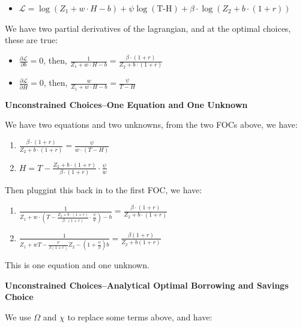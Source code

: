 \documentclass[
]{book}
\providecommand{\tightlist}{%
  \setlength{\itemsep}{0pt}\setlength{\parskip}{0pt}}
\begin{document}
\begin{itemize}
\tightlist
\item
  \(\displaystyle \mathcal{L}=\log (Z_1 +w\cdot H-b)+\psi \log (\textrm{T}\textrm{-}\textrm{H})+\beta \cdot \log (Z_2 +b\cdot (1+r))\)
\end{itemize}

We have two partial derivatives of the lagrangian, and at the optimal
choices, these are true:

\begin{itemize}
\item
  \(\frac{\partial \mathcal{L}}{\partial b}=0\), then,
  \(\frac{1}{Z_1 +w\cdot H-b}=\frac{\beta \cdot (1+r)}{Z_2 +b\cdot (1+r)}\)
\item
  \(\frac{\partial \mathcal{L}}{\partial H}=0\), then,
  \(\frac{w}{Z_1 +w\cdot H-b}=\frac{\psi }{T-H}\)
\end{itemize}

\textbf{Unconstrained Choices--One Equation and One Unknown}

We have two equations and two unknowns, from the two FOCs above, we
have:

\begin{enumerate}
\def\labelenumi{\arabic{enumi}.}
\item
  \(\displaystyle \frac{\beta \cdot (1+r)}{Z_2 +b\cdot (1+r)}=\frac{\psi }{w\cdot \left(T-H\right)}\)
\item
  \(\displaystyle H=T-\frac{Z_2 +b\cdot (1+r)}{\beta \cdot (1+r)}\cdot \frac{\psi }{w}\)
\end{enumerate}

Then pluggint this back in to the first FOC, we have:

\begin{enumerate}
\def\labelenumi{\arabic{enumi}.}
\item
  \(\displaystyle \frac{1}{Z_1 +w\cdot \left(T-\frac{Z_2 +b\cdot (1+r)}{\beta \cdot (1+r)}\cdot \frac{\psi }{w}\right)-b}=\frac{\beta \cdot (1+r)}{Z_2 +b\cdot (1+r)}\)
\item
  \(\displaystyle \frac{1}{Z_1 +wT-\frac{\psi }{\beta (1+r)}Z_2 -\left(1+\frac{\psi }{\beta }\right)b}=\frac{\beta (1+r)}{Z_2 +b(1+r)}\)
\end{enumerate}

This is one equation and one unknown.

\textbf{Unconstrained Choices--Analytical Optimal Borrowing and Savings
Choice}

We use \(\Omega\) and \(\chi\) to replace some terms above, and have:
\end{document}

